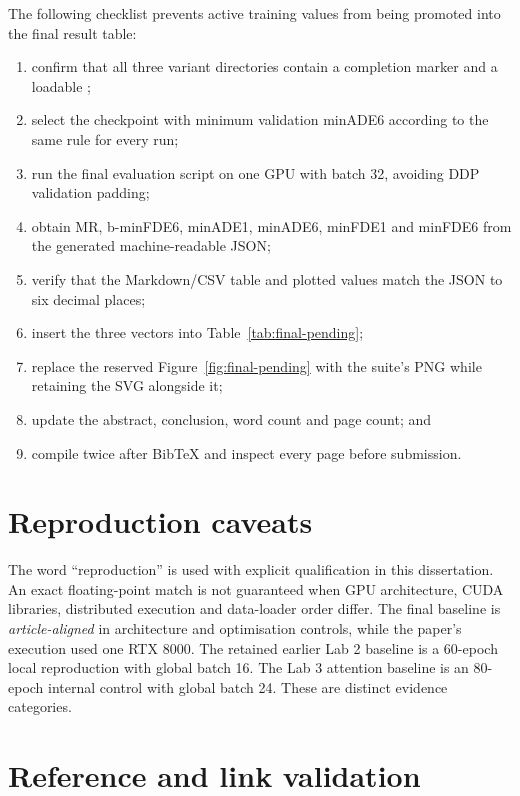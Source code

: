 The following checklist prevents active training values from being promoted into the final result table:

\begin{enumerate}
    \item confirm that all three variant directories contain a completion marker and a loadable ;
    \item select the checkpoint with minimum validation minADE6 according to the same rule for every run;
    \item run the final evaluation script on one GPU with batch 32, avoiding DDP validation padding;
    \item obtain MR, b-minFDE6, minADE1, minADE6, minFDE1 and minFDE6 from the generated machine-readable JSON;
    \item verify that the Markdown/CSV table and plotted values match the JSON to six decimal places;
    \item insert the three vectors into Table~\ref{tab:final-pending};
    \item replace the reserved Figure~\ref{fig:final-pending} with the suite's PNG while retaining the SVG alongside it;
    \item update the abstract, conclusion, word count and page count; and
    \item compile twice after BibTeX and inspect every page before submission.
\end{enumerate}

\section{Reproduction caveats}

The word ``reproduction'' is used with explicit qualification in this dissertation. An exact floating-point match is not guaranteed when GPU architecture, CUDA libraries, distributed execution and data-loader order differ. The final baseline is \emph{article-aligned} in architecture and optimisation controls, while the paper's execution used one RTX 8000. The retained earlier Lab 2 baseline is a 60-epoch local reproduction with global batch 16. The Lab 3 attention baseline is an 80-epoch internal control with global batch 24. These are distinct evidence categories.

\section{Reference and link validation}

